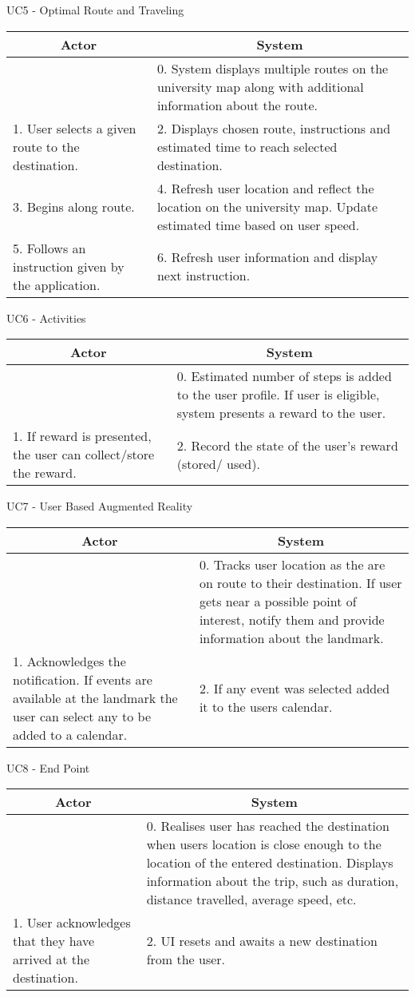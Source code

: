 \documentclass{article}
\begin{document}
\begin{center}
  UC5 - Optimal Route and Traveling
  \begin{tabular}{ |p{5.5cm}|p{5.5cm}| }
    \hline
    \multicolumn{1}{|c|}{Actor} & \multicolumn{1}{c|}{System} \\ \hline
     &0. System displays multiple routes on the university map along with additional information about the route.\\ \hline
     1. User selects a given route to the destination. &2. Displays chosen route, instructions and estimated time to reach selected destination.\\ \hline
     3. Begins along route.&4. Refresh user location and reflect the location on the university map. Update estimated time based on user speed.\\ \hline
     5. Follows an instruction given by the application.&6. Refresh user information and display next instruction.\\ \hline
  \end{tabular}
\hfill \break \hfill \break \hfill \break
  UC6 - Activities
  \begin{tabular}{ |p{5.5cm}|p{5.5cm}| }
    \hline
    \multicolumn{1}{|c|}{Actor} & \multicolumn{1}{c|}{System} \\ \hline
     &0. Estimated number of steps is added to the user profile. If user is eligible, system presents a reward to the user.\\ \hline
    1. If reward is presented, the user can collect/store the reward.&2. Record the state of the user’s reward (stored/ used).\\ \hline
  \end{tabular}
\hfill \break \hfill \break \hfill \break
  UC7 - User Based Augmented Reality
  \begin{tabular}{ |p{5.5cm}|p{5.5cm}| }
    \hline
    \multicolumn{1}{|c|}{Actor} & \multicolumn{1}{c|}{System} \\ \hline
     &0. Tracks user location as the are on route to their destination. If user gets near a possible point of interest, notify them and provide information about the landmark.\\ \hline
     1. Acknowledges the notification. If events are available at the landmark the user can select any to be added to a calendar. &2. If any event was selected added it to the users calendar.\\ \hline
  \end{tabular}
\newpage
  UC8 - End Point
  \begin{tabular}{ |p{5.5cm}|p{5.5cm}| }
    \hline
    \multicolumn{1}{|c|}{Actor} & \multicolumn{1}{c|}{System} \\ \hline
     &0. Realises user has reached the destination when users location is close enough to the location of the entered destination. Displays information about the trip, such as duration, distance travelled, average speed, etc.\\ \hline
     1. User acknowledges that they have arrived at the destination.&2. UI resets and awaits a new destination from the user.\\ \hline
  \end{tabular}
\end{center}
\end{document}
